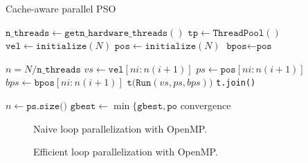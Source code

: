 \begin{algorithm}
  \caption{Cache-aware parallel PSO}\label{alg:par-pso}
  \begin{algorithmic}[1]
    \State $\texttt{n\_threads} \gets \texttt{getn\_hardware\_threads}()$
    \State $\texttt{tp} \gets \texttt{ThreadPool}()$
    \State $\texttt{vel} \gets \texttt{initialize}(N)$
    \State $\texttt{pos} \gets \texttt{initialize}(N)$
    \State $\texttt{bpos} \gets \texttt{pos}$

    \State $n = N/\texttt{n\_threads}$ 
    \State $vs \gets \texttt{vel}[ni:n(i+1)]$
    \State $ps \gets \texttt{pos}[ni:n(i+1)]$
    \State $bps \gets \texttt{bpos}[ni:n(i+1)]$
    \State $\texttt{t(Run}(vs, ps, bps))$
    \EndFor
    \State \texttt{t.join()}
    \EndFor
    \EndProcedure
  \end{algorithmic}
  \begin{algorithmic}[1]
    \State $n \gets \texttt{ps.size()}$
    \Repeat
    \State $\texttt{gbest} \gets \min\{\texttt{gbest}, \texttt{po}$
    \EndFor
    \State 
    \EndFor
    \Until convergence
    \EndProcedure
  \end{algorithmic}
\end{algorithm}

\begin{figure}
  
  \caption{Naive loop parallelization with OpenMP.}\label{fig:naive-par}
\end{figure}

\begin{figure}
  
  \caption{Efficient loop parallelization with OpenMP.}\label{fig:efficient-par}
\end{figure}

